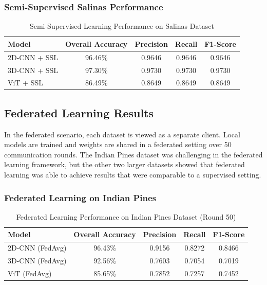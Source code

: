\subsubsection{Semi-Supervised Salinas Performance}
\begin{table}[H]
    \centering
    \caption{Semi-Supervised Learning Performance on Salinas Dataset}
    \label{tab:ssl_salinas}
    \renewcommand{\arraystretch}{1.2}
    \begin{tabular}{|l|c|c|c|c|}
        \hline
        \textbf{Model} & \textbf{Overall Accuracy} & \textbf{Precision} & \textbf{Recall} & \textbf{F1-Score} \\ \hline
        2D-CNN + SSL & 96.46\% & 0.9646 & 0.9646 & 0.9646 \\ \hline
        3D-CNN + SSL & 97.30\% & 0.9730 & 0.9730 & 0.9730 \\ \hline
        ViT + SSL & 86.49\% & 0.8649 & 0.8649 & 0.8649 \\ \hline
    \end{tabular}
\end{table}

\subsection{Federated Learning Results}
In the federated scenario, each dataset is viewed as a separate client. Local models are trained and weights are shared in a federated setting over 50 communication rounds. The Indian Pines dataset was challenging in the federated learning framework, but the other two larger datasets showed that federated learning was able to achieve results that were comparable to a supervised setting.

\subsubsection{Federated Learning on Indian Pines}
\begin{table}[H]
    \centering
    \caption{Federated Learning Performance on Indian Pines Dataset (Round 50)}
    \label{tab:federated_indian}
    \renewcommand{\arraystretch}{1.2}
    \begin{tabular}{|l|c|c|c|c|}
        \hline
        \textbf{Model} & \textbf{Overall Accuracy} & \textbf{Precision} & \textbf{Recall} & \textbf{F1-Score} \\ \hline
        2D-CNN (FedAvg) & 96.43\% & 0.9156 & 0.8272 & 0.8466 \\ \hline
        3D-CNN (FedAvg) & 92.56\% & 0.7603 & 0.7054 & 0.7019 \\ \hline
        ViT (FedAvg) & 85.65\% & 0.7852 & 0.7257 & 0.7452 \\ \hline
    \end{tabular}
\end{table}

